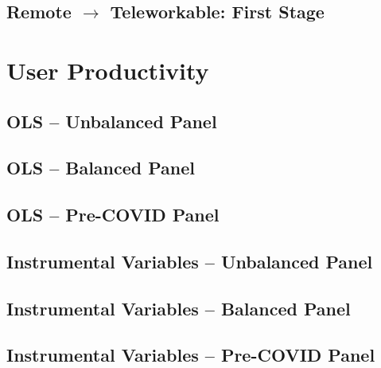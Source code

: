 \documentclass{article}
\newcommand{\cleanedresultsdir}{../results/cleaned}
\begin{document}
\subsection{Remote $\rightarrow$ Teleworkable: First Stage}



\clearpage
\section{User Productivity}
\label{sec:user_productivity}

\subsection{OLS -- Unbalanced Panel}


\subsection{OLS -- Balanced Panel}


\subsection{OLS -- Pre-COVID Panel}


\subsection{Instrumental Variables -- Unbalanced Panel}


\subsection{Instrumental Variables -- Balanced Panel}


\subsection{Instrumental Variables -- Pre-COVID Panel}

\end{document}
